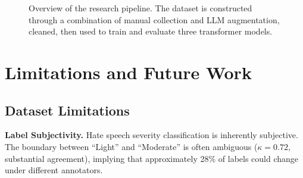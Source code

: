 \documentclass[10pt,twocolumn]{article}
\begin{document}
\begin{figure}[H]
\centering
{}
\caption{Overview of the research pipeline. The dataset is constructed through a combination of manual collection and LLM augmentation, cleaned, then used to train and evaluate three transformer models.}
\label{fig:pipeline}
\end{figure}

\section{Limitations and Future Work}

\subsection{Dataset Limitations}

\textbf{Label Subjectivity.} Hate speech severity classification is inherently subjective. The boundary between ``Light'' and ``Moderate'' is often ambiguous ($\kappa = 0.72$, substantial agreement), implying that approximately 28\% of labels could change under different annotators.
\end{document}
